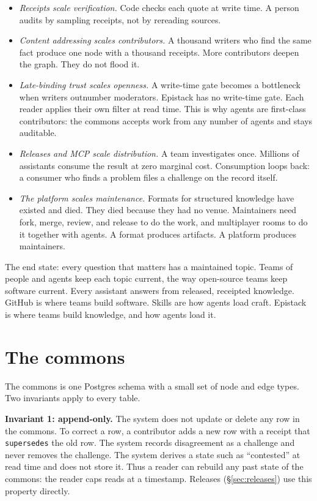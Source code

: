 \documentclass[10pt,twocolumn]{article}
\newcommand{\code}[1]{\texttt{\small #1}}
\begin{document}
\begin{itemize}
\item \emph{Receipts scale verification.} Code checks each quote at write
  time. A person audits by sampling receipts, not by rereading sources.
\item \emph{Content addressing scales contributors.} A thousand writers
  who find the same fact produce one node with a thousand receipts. More
  contributors deepen the graph. They do not flood it.
\item \emph{Late-binding trust scales openness.} A write-time gate
  becomes a bottleneck when writers outnumber moderators. Epistack has no
  write-time gate. Each reader applies their own filter at read time.
  This is why agents are first-class contributors: the commons accepts
  work from any number of agents and stays auditable.
\item \emph{Releases and MCP scale distribution.} A team investigates
  once. Millions of assistants consume the result at zero marginal cost.
  Consumption loops back: a consumer who finds a problem files a
  challenge on the record itself.
\item \emph{The platform scales maintenance.} Formats for structured
  knowledge have existed and died. They died because they had no venue.
  Maintainers need fork, merge, review, and release to do the work, and
  multiplayer rooms to do it together with agents. A format produces
  artifacts. A platform produces maintainers.
\end{itemize}

The end state: every question that matters has a maintained topic. Teams
of people and agents keep each topic current, the way open-source teams
keep software current. Every assistant answers from released, receipted
knowledge. GitHub is where teams build software. Skills are how agents
load craft. Epistack is where teams build knowledge, and how agents load
it.

\section{The commons}
\label{sec:commons}

The commons is one Postgres schema with a small set of node and edge
types. Two invariants apply to every table.

\textbf{Invariant 1: append-only.} The system does not update or delete
any row in the commons. To correct a row, a contributor adds a new row
with a receipt that \code{supersedes} the old row. The system records
disagreement as a challenge and never removes the challenge. The system
derives a state such as ``contested'' at read time and does not store it.
Thus a reader can rebuild any past state of the commons: the reader caps
reads at a timestamp. Releases (\S\ref{sec:releases}) use this property
directly.
\end{document}

